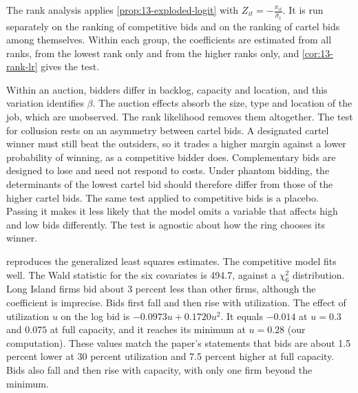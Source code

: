 The rank analysis applies \cref{prop:13-exploded-logit} with $Z_{it} = -\frac{x_{it}}{\hat\sigma_t}$. It is run
separately on the ranking of competitive bids and on the ranking of cartel bids among themselves. Within each
group, the coefficients are estimated from all ranks, from the lowest rank only and from the higher ranks only,
and \cref{cor:13-rank-lr} gives the test.

Within an auction, bidders differ in backlog, capacity and location, and this variation identifies $\beta$. The
auction effects absorb the size, type and location of the job, which are unobserved. The rank likelihood removes
them altogether. The test for collusion rests on an asymmetry between cartel bids. A designated cartel winner must
still beat the outsiders, so it trades a higher margin against a lower probability of winning, as a competitive
bidder does. Complementary bids are designed to lose and need not respond to costs. Under phantom bidding, the
determinants of the lowest cartel bid should therefore differ from those of the higher cartel bids. The same test
applied to competitive bids is a placebo. Passing it makes it less likely that the model omits a variable that
affects high and low bids differently. The test is agnostic about how the ring chooses its winner.

 reproduces the generalized least squares estimates. The competitive model fits well. The Wald
statistic for the six covariates is 494.7, against a $\chi^2_6$ distribution. Long Island firms bid about 3 percent
less than other firms, although the coefficient is imprecise. Bids first fall and then rise with utilization. The
effect of utilization $u$ on the log bid is $-0.0973u + 0.1720u^2$. It equals $-0.014$ at $u = 0.3$ and $0.075$ at
full capacity, and it reaches its minimum at $u = 0.28$ (our computation). These values match the paper's
statements that bids are about 1.5 percent lower at 30 percent utilization and 7.5 percent higher at full capacity. Bids also fall and then rise
with capacity, with only one firm beyond the minimum.

